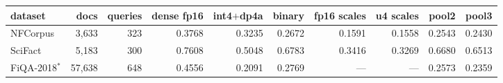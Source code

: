 \begin{tabular}{l r r r r r r r r r }
\toprule
dataset & docs & queries & dense fp16 & int4$+$dp4a & binary & fp16 scales & u4 scales & pool2 & pool3 \\
\midrule
NFCorpus & 3,633 & 323 & 0.3768 & 0.3235 & 0.2672 & 0.1591 & 0.1558 & 0.2543 & 0.2430 \\
SciFact & 5,183 & 300 & 0.7608 & 0.5048 & 0.6783 & 0.3416 & 0.3269 & 0.6680 & 0.6513 \\
FiQA-2018$^{\ast}$ & 57,638 & 648 & 0.4556 & 0.2091 & 0.2769 & --- & --- & 0.2573 & 0.2359 \\
\bottomrule
\end{tabular}
